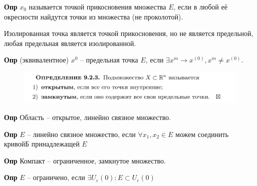 \documentclass{article}
\newcommand{\bb}{\textbf}
\begin{document}
\bb{Опр} $x_0$ называется точкой прикосновения множества $E$, если в любой её окресности найдутся точки из множества (не проколотой).

Изолированная точка является точкой прикосновения, но не является предельной, любая предельная является изолированной.

\bb{Опр} (эквивалентное) $x^{0}$ -- предельная точка $E$, если $\exists x^{m} \to x^{(0)}, x^{m}\neq x^{(0)}$.

\begin{figure}[h!]
    \centering
    \includegraphics[width=\textwidth]{9.png}
\end{figure}

\bb{Опр} Область -- открытое, линейно связное множество.

\bb{Опр} $E$ -- линейно связное множество, если $\forall x_1, x_2 \in E$ можем соединить кривойБ принадлежащей $E$

\bb{Опр} Компакт -- ограниченное, замкнутое множество.

\bb{Опр} $E$ -- ограничено, если $\exists U_\varepsilon(0) : E\subset U_\varepsilon(0)$
\end{document}
